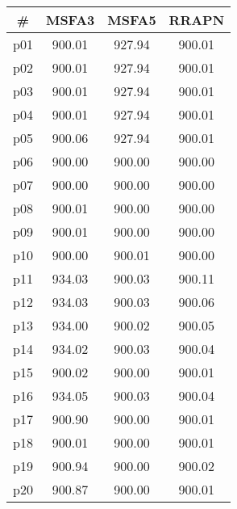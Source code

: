 \begin{tabular}{cccc}
\toprule
\textbf{\#} & \textbf{MSFA3} & \textbf{MSFA5} & \textbf{RRAPN}\\
\midrule
p01 & 900.01 & 927.94 & 900.01\\
p02 & 900.01 & 927.94 & 900.01\\
p03 & 900.01 & 927.94 & 900.01\\
p04 & 900.01 & 927.94 & 900.01\\
p05 & 900.06 & 927.94 & 900.01\\
p06 & 900.00 & 900.00 & 900.00\\
p07 & 900.00 & 900.00 & 900.00\\
p08 & 900.01 & 900.00 & 900.00\\
p09 & 900.01 & 900.00 & 900.00\\
p10 & 900.00 & 900.01 & 900.00\\
p11 & 934.03 & 900.03 & 900.11\\
p12 & 934.03 & 900.03 & 900.06\\
p13 & 934.00 & 900.02 & 900.05\\
p14 & 934.02 & 900.03 & 900.04\\
p15 & 900.02 & 900.00 & 900.01\\
p16 & 934.05 & 900.03 & 900.04\\
p17 & 900.90 & 900.00 & 900.01\\
p18 & 900.01 & 900.00 & 900.01\\
p19 & 900.94 & 900.00 & 900.02\\
p20 & 900.87 & 900.00 & 900.01\\
\bottomrule
\end{tabular}

